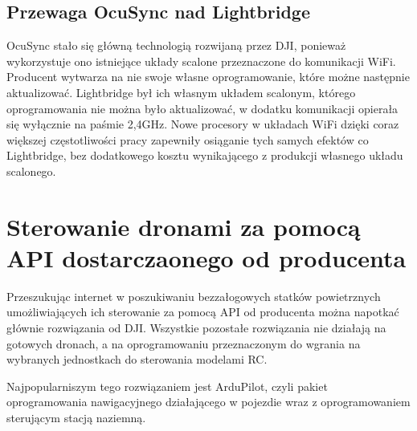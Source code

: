 \documentclass[12pt, a4paper, twoside]{report}
\begin{document}
\newpage

\subsection{Przewaga OcuSync nad Lightbridge}
\hspace{1cm}OcuSync stało się główną technologią rozwijaną przez DJI, ponieważ wykorzystuje ono istniejące układy scalone przeznaczone do komunikacji WiFi. Producent wytwarza na nie swoje własne oprogramowanie, które możne następnie aktualizować. Lightbridge był ich własnym układem scalonym, którego oprogramowania nie można było aktualizować, w dodatku komunikacji opierała się wyłącznie na paśmie 2,4GHz. Nowe procesory w układach WiFi dzięki coraz większej częstotliwości pracy zapewniły osiąganie tych samych efektów co Lightbridge, bez dodatkowego kosztu wynikającego z produkcji własnego układu scalonego. 

\section{Sterowanie dronami za pomocą API dostarczaonego od producenta}
\hspace{1cm}Przeszukując internet w poszukiwaniu bezzałogowych statków powietrznych umożliwiających ich sterowanie za pomocą API od producenta można napotkać głównie rozwiązania od DJI. Wszystkie pozostałe rozwiązania nie działają na gotowych dronach, a na oprogramowaniu przeznaczonym do wgrania na wybranych jednostkach do sterowania  modelami RC. 

\hspace{1cm}Najpopularniszym tego rozwiązaniem jest ArduPilot, czyli pakiet oprogramowania nawigacyjnego działającego w pojezdie wraz z oprogramowaniem sterującym stacją naziemną. 
\end{document}
